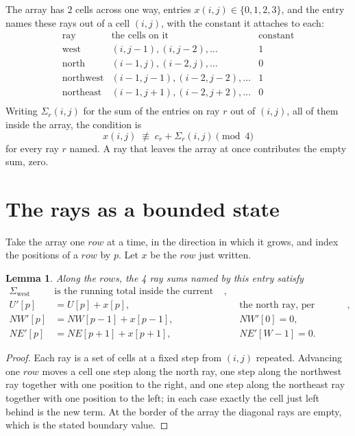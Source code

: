 \documentclass[11pt,a4paper]{article}
\theoremstyle{plain}
\newtheorem{lemma}[theorem]{Lemma}
\theoremstyle{definition}
\begin{document}
The array has $2$ cells across one way, entries $x(i,j)\in\{0,1,2,3\}$, and the entry names these
rays out of a cell $(i,j)$, with the constant it attaches to each:
\[
\begin{array}{lll}
\text{ray} & \text{the cells on it} & \text{constant} \\[2pt]
\text{west} & (i,j-1),(i,j-2),\dots & 1 \\
\text{north} & (i-1,j),(i-2,j),\dots & 0 \\
\text{northwest} & (i-1,j-1),(i-2,j-2),\dots & 1 \\
\text{northeast} & (i-1,j+1),(i-2,j+2),\dots & 0 \\
\end{array}
\]
Writing $\Sigma_r(i,j)$ for the sum of the entries on ray $r$ out of $(i,j)$, all of them
inside the array, the condition is
\[
x(i,j)\;\not\equiv\;c_r+\Sigma_r(i,j) \pmod{4}
\]
for every ray $r$ named. A ray that leaves the array at once contributes the empty sum,
zero.

\section{The rays as a bounded state}

Take the array one $row$ at a time, in the direction in which it grows, and index the
positions of a $row $ by $p$. Let $x$ be the $row$ just written.

\begin{lemma}\label{lem:rays}
Along the $row$s, the 4 ray sums named by this entry satisfy
\[
\begin{aligned}
\Sigma_{\mathrm{west}}\ &\text{is the running total inside the current row},\\
U'[p]&=U[p]+x[p], &&\text{the north ray, per position},\\
NW'[p]&=NW[p-1]+x[p-1], && NW'[0]=0,\\
NE'[p]&=NE[p+1]+x[p+1], && NE'[W-1]=0 .
\end{aligned}
\]
\end{lemma}

\begin{proof}
Each ray is a set of cells at a fixed step from $(i,j)$ repeated. Advancing one $row$
moves a cell one step along the north ray, one step along the northwest ray together with one
position to the right, and one step along the northeast ray together with one position to the
left; in each case exactly the cell just left behind is the new term. At the border of the
array the diagonal rays are empty, which is the stated boundary value.
\end{proof}
\end{document}
